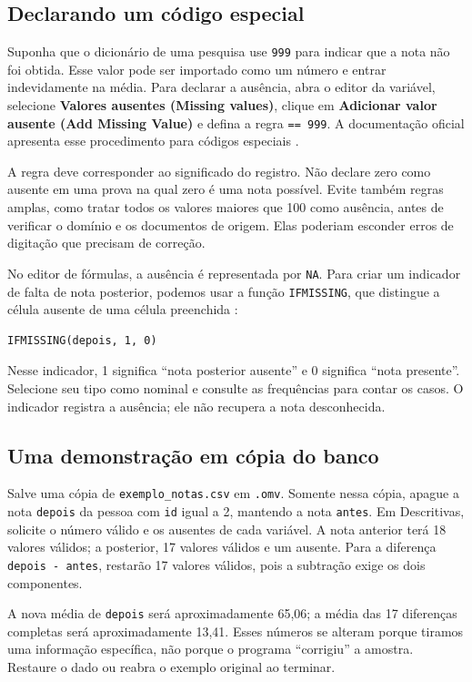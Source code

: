 \subsection{Declarando um código especial}

Suponha que o dicionário de uma pesquisa use \texttt{999} para indicar que a nota não foi obtida. Esse valor pode ser importado como um número e entrar indevidamente na média. Para declarar a ausência, abra o editor da variável, selecione \textbf{Valores ausentes (Missing values)}, clique em \textbf{Adicionar valor ausente (Add Missing Value)} e defina a regra \texttt{== 999}. A documentação oficial apresenta esse procedimento para códigos especiais \parencite{JamoviVariaveisDados}.

A regra deve corresponder ao significado do registro. Não declare zero como ausente em uma prova na qual zero é uma nota possível. Evite também regras amplas, como tratar todos os valores maiores que 100 como ausência, antes de verificar o domínio e os documentos de origem. Elas poderiam esconder erros de digitação que precisam de correção.

No editor de fórmulas, a ausência é representada por \texttt{NA}. Para criar um indicador de falta de nota posterior, podemos usar a função \texttt{IFMISSING}, que distingue a célula ausente de uma célula preenchida \parencite{JamoviFuncoes}:
\begin{verbatim}
IFMISSING(depois, 1, 0)
\end{verbatim}
Nesse indicador, 1 significa ``nota posterior ausente'' e 0 significa ``nota presente''. Selecione seu tipo como nominal e consulte as frequências para contar os casos. O indicador registra a ausência; ele não recupera a nota desconhecida.

\subsection{Uma demonstração em cópia do banco}

Salve uma cópia de \texttt{exemplo\_notas.csv} em \texttt{.omv}. Somente nessa cópia, apague a nota \texttt{depois} da pessoa com \texttt{id} igual a 2, mantendo a nota \texttt{antes}. Em Descritivas, solicite o número válido e os ausentes de cada variável. A nota anterior terá 18 valores válidos; a posterior, 17 valores válidos e um ausente. Para a diferença \texttt{depois - antes}, restarão 17 valores válidos, pois a subtração exige os dois componentes.

A nova média de \texttt{depois} será aproximadamente 65,06; a média das 17 diferenças completas será aproximadamente 13,41. Esses números se alteram porque tiramos uma informação específica, não porque o programa ``corrigiu'' a amostra. Restaure o dado ou reabra o exemplo original ao terminar.

